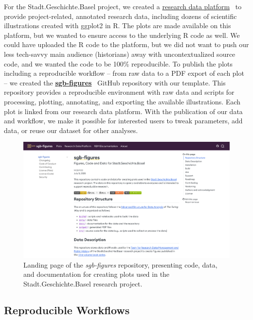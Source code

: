 \documentclass{anthology-ch}         %
\begin{document}
For the Stadt.Geschichte.Basel project, we created a \href{https://forschung.stadtgeschichtebasel.ch/}{research data platform}~\cite{goerlich2023} to provide project-related, annotated research data, including dozens of scientific illustrations created with ggplot2 in R. The plots are made available on this platform, but we wanted to ensure access to the underlying R code as well. We could have uploaded the R code to the platform, but we did not want to push our less tech-savvy main audience (historians) away with uncontextualized source code, and we wanted the code to be 100\% reproducible. To publish the plots including a reproducible workflow -- from raw data to a PDF export of each plot -- we created the \href{https://dokumentation.stadtgeschichtebasel.ch/sgb-figures}{\textbf{sgb-figures}}~\cite{twente2025c} GitHub repository with our template. This repository provides a reproducible environment with raw data and scripts for processing, plotting, annotating, and exporting the available illustrations. Each plot is linked from our research data platform. With the publication of our data and workflow, we make it possible for interested users to tweak parameters, add data, or reuse our dataset for other analyses.

\begin{figure}[t!]
  \centering
  \includegraphics[width=0.9\linewidth]{images/dokumentation_stadtgeschichtebasel_ch_sgb_figures.png}
  \caption{Landing page of the \emph{sgb-figures} repository, presenting code, data, and documentation for creating plots used in the Stadt.Geschichte.Basel research project.}
  \label{fig-sgb-figures}
\end{figure}

\subsection{Reproducible Workflows}\label{reproducible-workflows}
\end{document}
